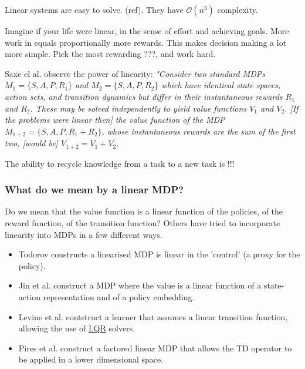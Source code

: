 
Linear systems are easy to solve. (ref). They have $\mathcal O(n^3)$ complexity.

Imagine if your life were linear, in the sense of effort and achieving goals.
More work in equals proportionally more rewards. This makes decision making
a lot more simple. Pick the most rewarding ???, and work hard.

Saxe el al. observe the power of linearity: \textit{"Consider two standard MDPs
$M_1 = \{S, A, P, R_1\}$ and $M_2 = \{S, A, P, R_2\}$ which have
identical state spaces, action sets, and transition dynamics but differ in their
instantaneous rewards $R_1$ and $R_2$. These may be solved independently to
yield value functions $V_1$ and $V_2$. [If the problems were linear then] the value function of the MDP
$M_{1+2} = \{S, A, P, R_1 +R_2\}$, whose instantaneous rewards are the sum of the
first two, [would be] $V_{1+2} = V_1 + V_2$.} \cite{Saxea}

The ability to recycle knowledge from a task to a new task is !!!




\subsubsection{What do we mean by a linear MDP?}

Do we mean that the value function is a linear function of the policies,
of the reward function, of the transition function? Others have tried to incorporate
linearity into MDPs in a few different ways.

\begin{itemize}
  \tightlist
  \item Todorov constructs a linearised MDP is linear in the 'control' (a proxy for the policy). \cite{Todorov2006}
  \item Jin et al. construct a MDP where the value is a linear function of a state-action representation and of a policy embedding. \cite{Wang}
  \item Levine et al. contstruct a learner that assumes a linear transition function, allowing the use of \href{https://en.wikipedia.org/wiki/Linear%E2%80%93quadratic_regulator}{LQR} solvers.\cite{Levine2019}
  \item Pires et al. construct a factored linear MDP that allows the TD operator to be applied in a lower dimensional space. \cite{Pires2016}
\end{itemize}

